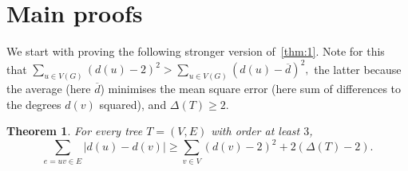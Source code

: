 \documentclass[a4paper,11pt]{article}
\newcommand*{\abs}[1]{\lvert #1\rvert}
\newtheorem{thm}[defi]{Theorem}
\newtheorem{lem}[defi]{Lemma}
\DeclareMathOperator{\irr}{irr}
\begin{document}
\section{Main proofs}




We start with proving the following stronger version of~\cref{thm:1}.
Note for this that $\sum_{u\in V(G)}(d(u)-2)^{2}>\sum_{u\in V(G)}(d(u)-\overline{d})^{2},$ the latter because the average (here $\overline d$) minimises the mean square error (here sum of differences to the degrees $d(v)$ squared), and $\Delta(T) \ge 2.$

\begin{thm}\label{thm:conj25_elegant}
    For every tree $T=(V, E)$ with order at least $3$,
    $$\sum_{e=uv \in E} \abs{d(u)-d(v)} \ge \sum_{v \in V} ( d(v)-2)^2 +2(\Delta(T)-2)  .$$
\end{thm}
\end{document}
